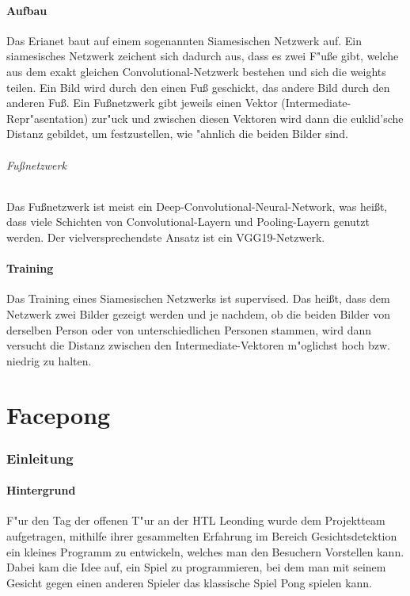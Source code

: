 \documentclass[12pt]{article}
\begin{document}
\subsection{Aufbau}
Das Erianet baut auf einem sogenannten {\glqq}Siamesischen Netzwerk{\grqq} auf.
Ein siamesisches Netzwerk zeichent sich dadurch aus, dass es zwei
{\glqq}F"u{\ss}e{\grqq} gibt, welche aus dem exakt gleichen Convolutional-Netzwerk 
bestehen und sich die weights teilen. Ein Bild wird durch den
einen Fu{\ss} geschickt, das andere Bild durch den anderen Fu{\ss}.
Ein Fu{\ss}netzwerk gibt jeweils einen Vektor (Intermediate-Repr"asentation)
zur"uck und zwischen diesen Vektoren wird dann die euklid'sche Distanz
gebildet, um festzustellen, wie "ahnlich die beiden Bilder sind.
\paragraph{Fu{\ss}netzwerk}
Das Fu{\ss}netzwerk ist meist ein Deep-Convolutional-Neural-Network, was hei{\ss}t,
dass viele Schichten von Convolutional-Layern und Pooling-Layern genutzt werden.
Der vielversprechendste Ansatz ist ein VGG19-Netzwerk.
\subsection{Training}
Das Training eines Siamesischen Netzwerks ist supervised. Das hei{\ss}t, dass
dem Netzwerk zwei Bilder gezeigt werden und je nachdem, ob die beiden Bilder
von derselben Person oder von unterschiedlichen Personen stammen, wird dann 
versucht die Distanz zwischen den Intermediate-Vektoren m"oglichst hoch bzw. 
niedrig zu halten.

\part{Facepong}
\section{Einleitung}
\subsection{Hintergrund}
F"ur den Tag der offenen T"ur an der HTL Leonding wurde dem Projektteam
aufgetragen, mithilfe ihrer gesammelten Erfahrung im Bereich Gesichtsdetektion
ein kleines Programm zu entwickeln, welches man den Besuchern Vorstellen kann.
Dabei kam die Idee auf, ein Spiel zu programmieren, bei dem man mit seinem Gesicht
gegen einen anderen Spieler das klassische Spiel {\glqq}Pong{\grqq} spielen kann.
\end{document}
